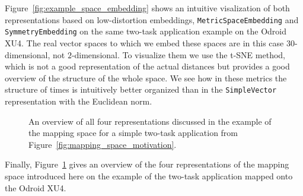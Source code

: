 Figure~\ref{fig:example_space_embedding} shows an intuitive visalization of both representations based on low-distortion embeddings, \texttt{MetricSpaceEmbedding} and \texttt{SymmetryEmbedding} on the same two-task application example on the Odroid XU4.
The real vector spaces to which we embed these spaces are in this case $30$-dimensional, not $2$-dimensional.
To visualize them we use the t-SNE method, which is not a good representation of the actual distances but provides a good overview of the structure of the whole space.
We see how in these metrics the structure of times is intuitively better organized than in the \texttt{SimpleVector} representation with the Euclidean norm. 

\begin{figure}[h]
	\centering
\resizebox{1.00\textwidth}{!}{
   \begin{tikzpicture}
     
   \end{tikzpicture}
 }
   \caption{An overview of all four representations discussed in the example of the mapping space for a simple two-task application from Figure~\ref{fig:mapping_space_motivation}.}
   \label{fig:mapping_space_full}
\end{figure}

Finally, Figure~\ref{fig:mapping_space_full} gives an overview of the four representations of the mapping space introduced here on the example of the two-task application mapped onto the Odroid XU4.